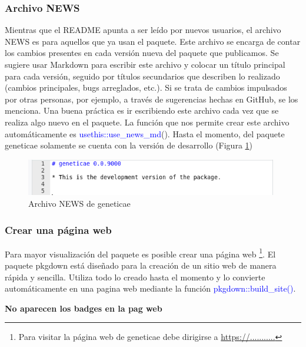 \subsubsection{Archivo NEWS}


Mientras que el README apunta a ser leído por nuevos usuarios, el archivo NEWS es para aquellos que ya usan el paquete.
Este archivo se encarga de contar los cambios presentes en cada versión nueva del paquete que publicamos.
Se sugiere usar Markdown para escribir este archivo y colocar un título principal para cada versión, seguido por títulos secundarios que describen lo realizado (cambios principales, bugs arreglados, etc.).
Si se trata de cambios impulsados por otras personas, por ejemplo, a través de sugerencias hechas en GitHub, se los menciona.
Una buena práctica es ir escribiendo este archivo cada vez que se realiza algo nuevo en el paquete.
La función que nos permite crear este archivo automáticamente es
\textcolor{blue}{usethis::use\_news\_md}(). Hasta el momento, del paquete geneticae solamente se cuenta con la versión de desarrollo (Figura \ref{fig:fig37}) 



\begin{figure}[H]
	\begin{center}
		\includegraphics[width=11cm]{./Graficos/News.png}	
	\end{center}
	\caption{Archivo NEWS de geneticae}
	\label{fig:fig37}
\end{figure}





\subsubsection{Crear una página web}

Para mayor visualización del paquete es posible crear una página web \footnote{Para visitar la página web de geneticae debe dirigirse a \url{https://...........}}. El paquete pkgdown está diseñado para la creación de un sitio web de manera rápida y sencilla. Utiliza todo lo creado hasta el momento y lo convierte automáticamente en una pagina web mediante la función \textcolor{blue}{pkgdown::build\_site()}.

 {\LARGE{\textbf{No aparecen los badges en la pag web}}}


